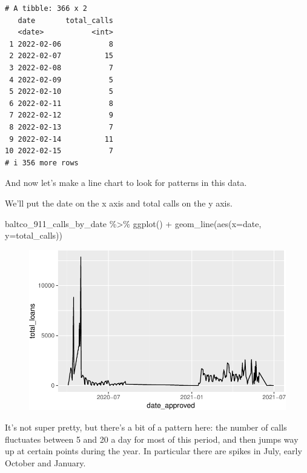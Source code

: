 \documentclass[
  letterpaper,
  DIV=11,
  numbers=noendperiod]{scrreprt}
\newenvironment{Shaded}{\begin{snugshade}}{\end{snugshade}}
\newcommand{\AttributeTok}[1]{\textcolor[rgb]{0.40,0.45,0.13}{#1}}
\newcommand{\FunctionTok}[1]{\textcolor[rgb]{0.28,0.35,0.67}{#1}}
\newcommand{\NormalTok}[1]{\textcolor[rgb]{0.00,0.23,0.31}{#1}}
\newcommand{\SpecialCharTok}[1]{\textcolor[rgb]{0.37,0.37,0.37}{#1}}
\begin{document}
\begin{verbatim}
# A tibble: 366 x 2
   date       total_calls
   <date>           <int>
 1 2022-02-06           8
 2 2022-02-07          15
 3 2022-02-08           7
 4 2022-02-09           5
 5 2022-02-10           5
 6 2022-02-11           8
 7 2022-02-12           9
 8 2022-02-13           7
 9 2022-02-14          11
10 2022-02-15           7
# i 356 more rows
\end{verbatim}

And now let's make a line chart to look for patterns in this data.

We'll put the date on the x axis and total calls on the y axis.

\begin{Shaded}
\begin{Highlighting}[]
\NormalTok{baltco\_911\_calls\_by\_date }\SpecialCharTok{\%\textgreater{}\%}
  \FunctionTok{ggplot}\NormalTok{() }\SpecialCharTok{+} 
  \FunctionTok{geom\_line}\NormalTok{(}\FunctionTok{aes}\NormalTok{(}\AttributeTok{x=}\NormalTok{date, }\AttributeTok{y=}\NormalTok{total\_calls))}
\end{Highlighting}
\end{Shaded}

\begin{figure}[H]

{\centering \includegraphics{./visualizing-for-reporting_files/figure-pdf/unnamed-chunk-13-1.pdf}

}

\end{figure}

It's not super pretty, but there's a bit of a pattern here: the number
of calls fluctuates between 5 and 20 a day for most of this period, and
then jumps way up at certain points during the year. In particular there
are spikes in July, early October and January.
\end{document}
